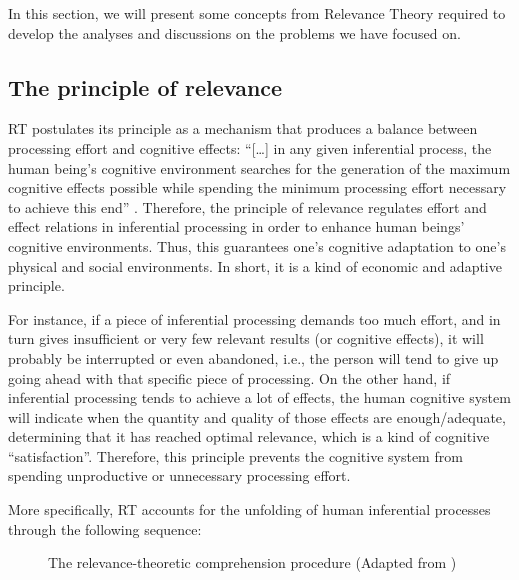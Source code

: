 \documentclass[output=paper]{langsci/langscibook}
\begin{document}
In this section, we will present some concepts from Relevance Theory required to develop the analyses and discussions on the problems we have focused on.


\subsection{The principle of relevance}

RT postulates its principle as a mechanism that produces a balance between processing effort and cognitive effects: “[…] in any given inferential process, the human being’s cognitive environment searches for the generation of the maximum cognitive effects possible while spending the minimum processing effort necessary to achieve this end” \citep[p. 109]{alves2013}. Therefore, the principle of relevance regulates effort and effect relations in inferential processing in order to enhance human beings’ cognitive environments. Thus, this guarantees one’s cognitive adaptation to one’s physical and social environments. In short, it is a kind of economic and adaptive principle.


For instance, if a piece of inferential processing demands too much effort, and in turn gives insufficient or very few relevant results (or cognitive effects), it will probably be interrupted or even abandoned, i.e., the person will tend to give up going ahead with that specific piece of processing. On the other hand, if inferential processing tends to achieve a lot of effects, the human cognitive system will indicate when the quantity and quality of those effects are enough/adequate, determining that it has reached optimal relevance, which is a kind of cognitive “satisfaction”. Therefore, this principle prevents the cognitive system from spending unproductive or unnecessary processing effort.



More specifically, RT accounts for the unfolding of human inferential processes through the following sequence:


  
\begin{figure}

 \caption{The relevance-theoretic comprehension procedure (Adapted from \citealt[6]{alves2003})}
 \label{sarto:fig:1}
\end{figure} 
\end{document}
